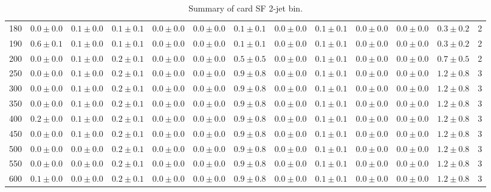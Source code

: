 \begin{table}
{\begin{center}
\begin{tabular}{l | c c | c c c c c c c c  | c c}
180 & $0.0\pm0.0$ & $0.1\pm0.0$ & $0.1\pm0.1$ & $0.0\pm0.0$ & $0.0\pm0.0$ & $0.1\pm0.1$ & $0.0\pm0.0$ & $0.1\pm0.1$ & $0.0\pm0.0$ & $0.0\pm0.0$ & $0.3\pm0.2$ & 2 \\
190 & $0.6\pm0.1$ & $0.1\pm0.0$ & $0.1\pm0.1$ & $0.0\pm0.0$ & $0.0\pm0.0$ & $0.1\pm0.1$ & $0.0\pm0.0$ & $0.1\pm0.1$ & $0.0\pm0.0$ & $0.0\pm0.0$ & $0.3\pm0.2$ & 2 \\
200 & $0.0\pm0.0$ & $0.1\pm0.0$ & $0.2\pm0.1$ & $0.0\pm0.0$ & $0.0\pm0.0$ & $0.5\pm0.5$ & $0.0\pm0.0$ & $0.1\pm0.1$ & $0.0\pm0.0$ & $0.0\pm0.0$ & $0.7\pm0.5$ & 2 \\
250 & $0.0\pm0.0$ & $0.1\pm0.0$ & $0.2\pm0.1$ & $0.0\pm0.0$ & $0.0\pm0.0$ & $0.9\pm0.8$ & $0.0\pm0.0$ & $0.1\pm0.1$ & $0.0\pm0.0$ & $0.0\pm0.0$ & $1.2\pm0.8$ & 3 \\
300 & $0.0\pm0.0$ & $0.1\pm0.0$ & $0.2\pm0.1$ & $0.0\pm0.0$ & $0.0\pm0.0$ & $0.9\pm0.8$ & $0.0\pm0.0$ & $0.1\pm0.1$ & $0.0\pm0.0$ & $0.0\pm0.0$ & $1.2\pm0.8$ & 3 \\
350 & $0.0\pm0.0$ & $0.1\pm0.0$ & $0.2\pm0.1$ & $0.0\pm0.0$ & $0.0\pm0.0$ & $0.9\pm0.8$ & $0.0\pm0.0$ & $0.1\pm0.1$ & $0.0\pm0.0$ & $0.0\pm0.0$ & $1.2\pm0.8$ & 3 \\
400 & $0.2\pm0.0$ & $0.1\pm0.0$ & $0.2\pm0.1$ & $0.0\pm0.0$ & $0.0\pm0.0$ & $0.9\pm0.8$ & $0.0\pm0.0$ & $0.1\pm0.1$ & $0.0\pm0.0$ & $0.0\pm0.0$ & $1.2\pm0.8$ & 3 \\
450 & $0.0\pm0.0$ & $0.1\pm0.0$ & $0.2\pm0.1$ & $0.0\pm0.0$ & $0.0\pm0.0$ & $0.9\pm0.8$ & $0.0\pm0.0$ & $0.1\pm0.1$ & $0.0\pm0.0$ & $0.0\pm0.0$ & $1.2\pm0.8$ & 3 \\
500 & $0.0\pm0.0$ & $0.0\pm0.0$ & $0.2\pm0.1$ & $0.0\pm0.0$ & $0.0\pm0.0$ & $0.9\pm0.8$ & $0.0\pm0.0$ & $0.1\pm0.1$ & $0.0\pm0.0$ & $0.0\pm0.0$ & $1.2\pm0.8$ & 3 \\
550 & $0.0\pm0.0$ & $0.0\pm0.0$ & $0.2\pm0.1$ & $0.0\pm0.0$ & $0.0\pm0.0$ & $0.9\pm0.8$ & $0.0\pm0.0$ & $0.1\pm0.1$ & $0.0\pm0.0$ & $0.0\pm0.0$ & $1.2\pm0.8$ & 3 \\
600 & $0.1\pm0.0$ & $0.0\pm0.0$ & $0.2\pm0.1$ & $0.0\pm0.0$ & $0.0\pm0.0$ & $0.9\pm0.8$ & $0.0\pm0.0$ & $0.1\pm0.1$ & $0.0\pm0.0$ & $0.0\pm0.0$ & $1.2\pm0.8$ & 3 \\
\hline
\end{tabular}
\end{center}
}
\caption{Summary of card SF 2-jet bin.}
\end{table}
